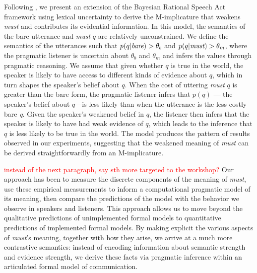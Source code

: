 \documentclass[11pt]{article}
\newcommand{\red}[1]{\textcolor{Red}{#1}}
\begin{document}
Following , we present an extension of the Bayesian Rational Speech Act framework  using lexical uncertainty to derive the M-implicature that weakens \emph{must} and contributes its evidential information. In this model,  the semantics of the bare utterance and \emph{must} $q$ are relatively unconstrained. We define the semantics of the utterances such that $p(q | \emph{bare} ) > \theta_b$ and $p(q | \emph{must} ) > \theta_m$, where the pragmatic listener is uncertain about $\theta_b$ and $\theta_m$ and infers the values through pragmatic reasoning. We assume that given whether $q$ is true in the world, the speaker is likely to have access to different kinds of evidence about $q$, which in turn shapes the speaker's belief about $q$. When the cost of uttering \emph{must} $q$ is greater than the bare form, the pragmatic listener infers that $p(q)$ --- the speaker's belief about $q$---is less likely than when the utterance is the less costly bare \emph{q}.
Given the speaker's weakened belief in $q$, the listener then infers that the speaker is likely to have had weak evidence of $q$, which leads to the inference that $q$ is less likely to be true in the world. The model produces the pattern of results observed in our experiments, suggesting that the weakened meaning of \emph{must} can be derived straightforwardly from an M-implicature.


\red{instead of the next paragraph, say sth more targeted to the workshop?} Our approach has been to measure the discrete components of the meaning of \emph{must}, use these empirical measurements to inform a computational pragmatic model of its meaning, then compare the predictions of the model with the behavior we observe in speakers and listeners. This approach allows us to move beyond the qualitative predictions of unimplemented formal models to quantitative predictions of implemented formal models. By making explicit the various aspects of \emph{must}'s meaning, together with how they arise, we arrive at a much more contrastive semantics: instead of encoding information about semantic strength and evidence strength, we derive these facts via pragmatic inference within an articulated formal model of communication. 




\end{document}
